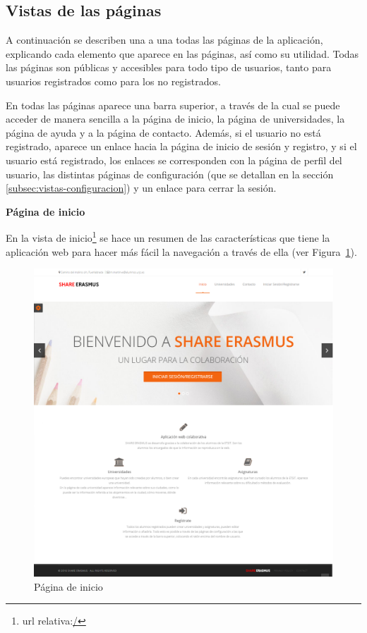 \documentclass[a4paper, 12pt]{book}
\begin{document}
\subsection{Vistas de las páginas} 
\label{subsec:vistas-paginas}

A continuación se describen una a una todas las páginas de la aplicación, explicando cada elemento que aparece en las páginas, así como su utilidad. Todas las páginas son públicas y accesibles para todo tipo de usuarios, tanto para usuarios registrados como para los no registrados.
\newline

En todas las páginas aparece una barra superior, a través de la cual se puede acceder de manera sencilla a la página de inicio, la página de universidades, la página de ayuda y a la página de contacto. Además, si el usuario no está registrado, aparece un enlace hacia la página de inicio de sesión y registro, y si el usuario está registrado, los enlaces se corresponden con la página de perfil del usuario, las distintas páginas de configuración (que se detallan en la sección \ref{subsec:vistas-configuracion}) y un enlace para cerrar la sesión.
\newline

{\large  \textbf{Página de inicio}\par}

En la vista de inicio\footnote{url relativa:\url{/}} se hace un resumen de las características que tiene la aplicación web para hacer más fácil la navegación a través de ella (ver Figura~\ref{fig:inicio}).
\newline

\begin{figure}[H]
  \centering
  \includegraphics[width=14cm, keepaspectratio]{img/inicio.png}
  \caption{Página de inicio}
  \label{fig:inicio}
\end{figure}
\end{document}

